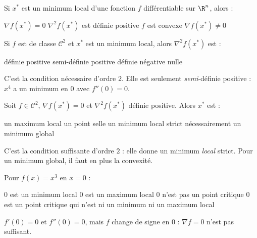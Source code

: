 
\begin{question}
Si $x^*$ est un minimum local d'une fonction $f$ différentiable sur $\R^n$, alors :
\begin{reponses}
  \bonne $\nabla f(x^*)=0$
  \mauvaise $\nabla^2f(x^*)$ est définie positive
  \mauvaise $f$ est convexe
  \mauvaise $\nabla f(x^*)\neq0$
\end{reponses}
\end{question}

\begin{question}
Si $f$ est de classe $\mathcal C^2$ et $x^*$ est un minimum local, alors $\nabla^2f(x^*)$ est :
\begin{reponses}
  \mauvaise définie positive
  \bonne semi-définie positive
  \mauvaise définie négative
  \mauvaise nulle
\end{reponses}
\begin{explication}
C'est la condition nécessaire d'ordre $2$. Elle est seulement \emph{semi}-définie positive : $x^4$ a un minimum en $0$ avec $f''(0)=0$.
\end{explication}
\end{question}

\begin{question}
Soit $f\in\mathcal C^2$, $\nabla f(x^*)=0$ et $\nabla^2f(x^*)$ définie positive. Alors $x^*$ est :
\begin{reponses}
  \mauvaise un maximum local
  \mauvaise un point selle
  \bonne un minimum local strict
  \mauvaise nécessairement un minimum global
\end{reponses}
\begin{explication}
C'est la condition suffisante d'ordre $2$ : elle donne un minimum \emph{local} strict. Pour un minimum global, il faut en plus la convexité.
\end{explication}
\end{question}

\begin{question}
Pour $f(x)=x^3$ en $x=0$ :
\begin{reponses}
  \mauvaise $0$ est un minimum local
  \mauvaise $0$ est un maximum local
  \mauvaise $0$ n'est pas un point critique
  \bonne $0$ est un point critique qui n'est ni un minimum ni un maximum local
\end{reponses}
\begin{explication}
$f'(0)=0$ et $f''(0)=0$, mais $f$ change de signe en $0$ : $\nabla f=0$ n'est pas suffisant.
\end{explication}
\end{question}

